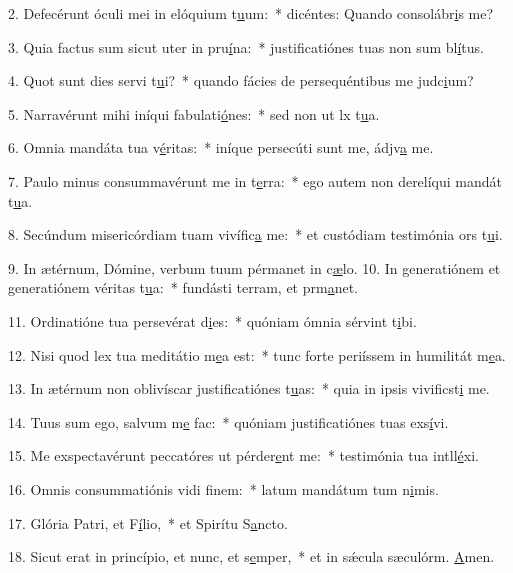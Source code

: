 2. Defecérunt óculi mei in elóquium t\uline{u}um:~* dicéntes: Quando consolábr\uline{i}s me?\par 
3. Quia factus sum sicut uter in pru\uline{í}na:~* justificatiónes tuas non sum bl\uline{í}tus.\par 
4. Quot sunt dies servi t\uline{u}i?~* quando fácies de persequéntibus me judc\uline{i}um?\par 
5. Narravérunt mihi iníqui fabulati\uline{ó}nes:~* sed non ut lx t\uline{u}a.\par 
6. Omnia mandáta tua v\uline{é}ritas:~* iníque persecúti sunt me, ádjv\uline{a} me.\par 
7. Paulo minus consummavérunt me in t\uline{e}rra:~* ego autem non derelíqui mandát t\uline{u}a.\par 
8. Secúndum misericórdiam tuam vivífic\uline{a} me:~* et custódiam testimónia ors t\uline{u}i.\par 
9. In ætérnum, Dómine, verbum tuum pérmanet in c\uline{æ}lo.
10. In generatiónem et generatiónem véritas t\uline{u}a:~* fundásti terram, et prm\uline{a}net.\par 
11. Ordinatióne tua persevérat d\uline{i}es:~* quóniam ómnia sérvint t\uline{i}bi.\par 
12. Nisi quod lex tua meditátio m\uline{e}a est:~* tunc forte periíssem in humilitát m\uline{e}a.\par 
13. In ætérnum non oblivíscar justificatiónes t\uline{u}as:~* quia in ipsis vivificst\uline{i} me.\par 
14. Tuus sum ego, salvum m\uline{e} fac:~* quóniam justificatiónes tuas exs\uline{í}vi.\par 
15. Me exspectavérunt peccatóres ut pérder\uline{e}nt me:~* testimónia tua intll\uline{é}xi.\par 
16. Omnis consummatiónis vidi f\uline{i}nem:~* latum mandátum tum n\uline{i}mis.\par 
17. Glória Patri, et F\uline{í}lio,~* et Spirítu S\uline{a}ncto.\par 
18. Sicut erat in princípio, et nunc, et s\uline{e}mper,~* et in sǽcula sæculórm. \uline{A}men.\par 
